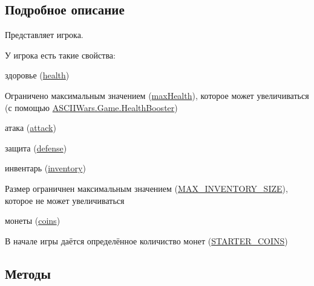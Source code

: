 \subsection{Подробное описание}
Представляет игрока. 

У игрока есть такие свойства\+:
\begin{DoxyItemize}
\item здоровье (\hyperlink{class_a_s_c_i_i_wars_1_1_game_1_1_player_a8f364a47ef452b6c99bc13b7bdaae7ca}{health})
\begin{DoxyItemize}
\item Ограничено максимальным значением (\hyperlink{class_a_s_c_i_i_wars_1_1_game_1_1_player_acfd121f865f0e5a87f177e93c82feadc}{max\+Health}), которое может увеличиваться (с помощью \hyperlink{class_a_s_c_i_i_wars_1_1_game_1_1_health_booster}{A\+S\+C\+I\+I\+Wars.\+Game.\+Health\+Booster})
\end{DoxyItemize}
\item атака (\hyperlink{class_a_s_c_i_i_wars_1_1_game_1_1_player_a45736ed2f9941e3877df09db83cd4032}{attack})
\item защита (\hyperlink{class_a_s_c_i_i_wars_1_1_game_1_1_player_a1dc39c7d8054c42dcb7af70e78b3be02}{defense})
\item инвентарь (\hyperlink{class_a_s_c_i_i_wars_1_1_game_1_1_player_a04acfaa196162f89bfae7aee5ec45480}{inventory})
\begin{DoxyItemize}
\item Размер ограничнен максимальным значением (\hyperlink{class_a_s_c_i_i_wars_1_1_game_1_1_player_a1cc8a05398a717bcf8c5a0ebd2ea0747}{M\+A\+X\+\_\+\+I\+N\+V\+E\+N\+T\+O\+R\+Y\+\_\+\+S\+I\+ZE}), которое не может увеличиваться
\end{DoxyItemize}
\item монеты (\hyperlink{class_a_s_c_i_i_wars_1_1_game_1_1_player_a5abede19c5428143df924357ad475691}{coins})
\begin{DoxyItemize}
\item В начале игры даётся определённое количиство монет (\hyperlink{class_a_s_c_i_i_wars_1_1_game_1_1_player_af33b6af0d723918290a4a38aa4a6fb66}{S\+T\+A\+R\+T\+E\+R\+\_\+\+C\+O\+I\+NS}) 
\end{DoxyItemize}
\end{DoxyItemize}

\subsection{Методы}
\hypertarget{class_a_s_c_i_i_wars_1_1_game_1_1_player_a51054cd802e781a9f0a018f893ec3877}{}\label{class_a_s_c_i_i_wars_1_1_game_1_1_player_a51054cd802e781a9f0a018f893ec3877} 
